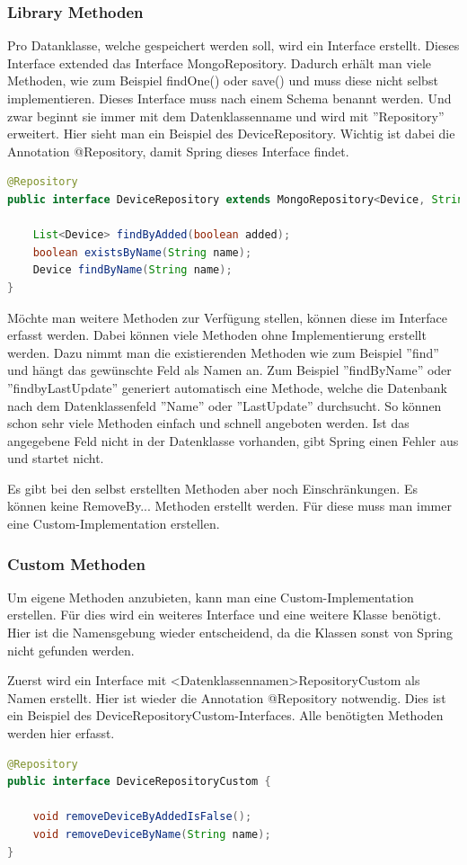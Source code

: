 \subsubsection{Library Methoden}
Pro Datanklasse, welche gespeichert werden soll, wird ein Interface erstellt. Dieses Interface extended das Interface MongoRepository. Dadurch erhält man viele Methoden, wie zum Beispiel findOne() oder save() und muss diese nicht selbst implementieren. Dieses Interface muss nach einem Schema benannt werden. Und zwar beginnt sie immer mit dem Datenklassenname und wird mit ''Repository'' erweitert. Hier sieht man ein Beispiel des DeviceRepository. Wichtig ist dabei die Annotation @Repository, damit Spring dieses Interface findet. 
\begin{lstlisting}[language=java]
@Repository
public interface DeviceRepository extends MongoRepository<Device, String>, DeviceRepositoryCustom {
	
	List<Device> findByAdded(boolean added);
	boolean existsByName(String name);
	Device findByName(String name);
}
\end{lstlisting}

Möchte man weitere Methoden zur Verfügung stellen, können diese im Interface erfasst werden. Dabei können viele Methoden ohne Implementierung erstellt werden. Dazu nimmt man die existierenden Methoden wie zum Beispiel ''find'' und hängt das gewünschte Feld als Namen an. Zum Beispiel ''findByName'' oder ''findbyLastUpdate'' generiert automatisch eine Methode, welche die Datenbank nach dem Datenklassenfeld ''Name'' oder ''LastUpdate'' durchsucht. So können schon sehr viele Methoden einfach und schnell angeboten werden. Ist das angegebene Feld nicht in der Datenklasse vorhanden, gibt Spring einen Fehler aus und startet nicht.

Es gibt bei den selbst erstellten Methoden aber noch Einschränkungen. Es können keine RemoveBy... Methoden erstellt werden. Für diese muss man immer eine Custom-Implementation erstellen.

\subsubsection{Custom Methoden}
Um eigene Methoden anzubieten, kann man eine Custom-Implementation erstellen. Für dies wird ein weiteres Interface und eine weitere Klasse benötigt. Hier ist die Namensgebung wieder entscheidend, da die Klassen sonst von Spring nicht gefunden werden.

Zuerst wird ein Interface mit <Datenklassennamen>RepositoryCustom als Namen erstellt. Hier ist wieder die Annotation @Repository notwendig. Dies ist ein Beispiel des DeviceRepositoryCustom-Interfaces. Alle benötigten Methoden werden hier erfasst.
\begin{lstlisting}[language=java]
@Repository
public interface DeviceRepositoryCustom {

	void removeDeviceByAddedIsFalse();
	void removeDeviceByName(String name);
}
\end{lstlisting}

